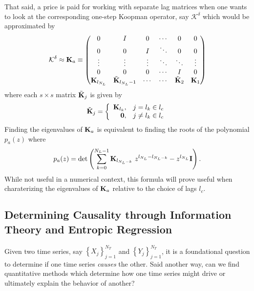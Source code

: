 \documentclass[a4paper,11pt]{article}
\newcommand{\ba}{\begin{array}}
\newcommand{\ea}{\end{array}}
\begin{document}
That said, a price is paid for working with separate lag matrices when one wants to look at the corresponding one-step Koopman operator, say $\mathcal{K}^{\delta}$ which would be approximated by
\begin{equation}
\mathcal{K}^{\delta} \approx {\bf K}_{a} \equiv 
\begin{pmatrix} 
0 & I & 0 & \cdots & 0 & 0 \\ 
0 & 0 & I & \ddots & 0 & 0 \\ 
\vdots & \vdots & \vdots & \ddots & \ddots & \vdots \\
0 & 0 & 0 & \cdots & I & 0 \\
{\bf K}_{l_{N_{L}}} & \tilde{{\bf K}}_{l_{N_{L}}-1} & \cdots & \cdots & \tilde{{\bf K}}_{2} & {\bf K}_{1} 
\end{pmatrix}
\label{full_matrix}
\end{equation}
where each $s\times s$ matrix $\tilde{{\bf K}}_{j}$ is given by 
\[
\tilde{{\bf K}}_{j} = \left\{
\ba{rl}  
{\bf K}_{l_{k}}, & j=l_{k}\in l_{c}\\
{\bf 0}, & j\neq l_{k}\in l_{c}
\ea
\right.
\]
Finding the eigenvalues of ${\bf K}_{a}$ is equivalent to finding the roots of the polynomial $p_{a}(z)$ where 
\begin{equation}
p_{a}(z) = \text{det}\left(\sum_{k=0}^{N_{L}-1}{\bf K}_{l_{N_{L}-k}}~z^{l_{N_{L}}-l_{N_{L}-k}} - z^{l_{N_{L}}}{\bf I} \right). 
\label{characpoly}
\end{equation}
While not useful in a numerical context, this formula will prove useful when charaterizing the eigenvalues of ${\bf K}_{a}$ relative to the choice of lags $l_{c}$.  

\subsection{Determining Causality through Information Theory and Entropic Regression}

Given two time series, say $\left\{X_{j}\right\}_{j=1}^{N_{T}}$ and $\left\{Y_{j}\right\}_{j=1}^{N_{T}}$, it is a foundational question to determine if one time series {\it causes} the other.  Said another way, can we find quantitative methods which determine how one time series might drive or ultimately explain the behavior of another?  
\end{document}
